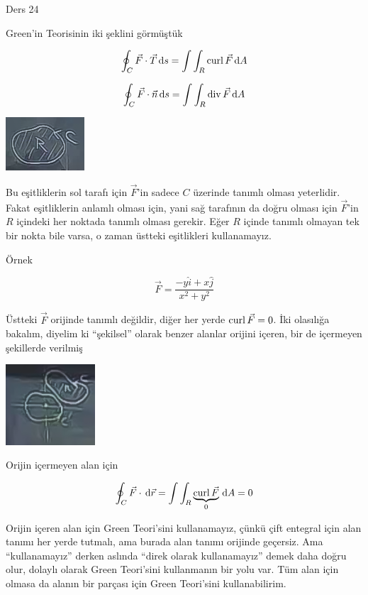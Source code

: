 \documentclass[12pt,fleqn]{article}\usepackage{../../common}
\begin{document}
Ders 24

Green'in Teorisinin iki şeklini görmüştük

$$ \oint_C \vec{F} \cdot \vec{T} \,\mathrm{d} s = \int \int_R \operatorname{curl} \vec{F} \,\mathrm{d} A $$

$$ \oint_C \vec{F} \cdot \vec{n} \,\mathrm{d} s = \int \int_R \operatorname{div} \vec{F} \,\mathrm{d} A $$

\begin{center}
\includegraphics[height=2cm]{24_1.png}
\end{center}

Bu eşitliklerin sol tarafı için $\vec{F}$'in sadece $C$ üzerinde tanımlı
olması yeterlidir. Fakat eşitliklerin anlamlı olması için, yani sağ
tarafının da doğru olması için $\vec{F}$'in $R$ içindeki her noktada tanımlı
olması gerekir. Eğer $R$ içinde tanımlı olmayan tek bir nokta bile varsa, o
zaman üstteki eşitlikleri kullanamayız.

Örnek 

$$ \vec{F} = \frac{ -y\hat{i} + x\hat{j}}{x^2+y^2} $$

Üstteki $\vec{F}$ orijinde tanımlı değildir, diğer her yerde $\operatorname{curl} \vec{F} =
0$.  İki olasılığa bakalım, diyelim ki ``şekilsel'' olarak benzer alanlar
orijini içeren, bir de içermeyen şekillerde verilmiş

\begin{center}
\includegraphics[height=3cm]{24_2.png}
\end{center}

Orijin içermeyen alan için

$$
\oint_C \vec{F} \cdot \,\mathrm{d}\vec{r} = 
\int \int_R \underbrace{\operatorname{curl} \vec{F}}_{0} \,\mathrm{d} A  = 0
$$
 
Orijin içeren alan için Green Teori'sini kullanamayız, çünkü çift entegral
için alan tanımı her yerde tutmalı, ama burada alan tanımı orijinde
geçersiz. Ama ``kullanamayız'' derken aslında ``direk olarak kullanamayız''
demek daha doğru olur, dolaylı olarak Green Teori'sini kullanmanın bir yolu
var. Tüm alan için olmasa da alanın bir parçası için Green Teori'sini
kullanabilirim. 
\end{document}
